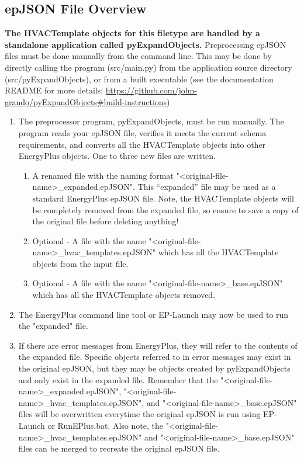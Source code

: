 \subsection{epJSON File Overview}
\textbf{The HVACTemplate objects for this filetype are handled by a standalone application called pyExpandObjects.}  Preprocessing epJSON files must be done manually from the command line.  This may be done by directly calling the program (src/main.py) from the application source directory (src/pyExpandObjects), or from a built executable (see the documentation README for more details: \url{https://github.com/john-grando/pyExpandObjects#build-instructions})

\begin{enumerate}
\def\labelenumi{\arabic{enumi})}
\item
  The preprocessor program, pyExpandObjects, must be run manually.  The program reads your epJSON file, verifies it meets the current schema requirements, and converts all the HVACTemplate objects into other EnergyPlus objects.  One to three new files are written.
  \begin{enumerate}
  \item
    A renamed file with the naming format "<original-file-name>\_expanded.epJSON". This “expanded” file may be used as a standard EnergyPlus epJSON file.  Note, the HVACTemplate objects will be completely removed from the expanded file, so ensure to save a copy of the original file before deleting anything!
  \item
    Optional - A file with the name "<original-file-name>\_hvac\_templates.epJSON" which has all the HVACTemplate objects from the input file.
  \item
    Optional - A file with the name "<original-file-name>\_base.epJSON" which has all the HVACTemplate objects removed.
  \end{enumerate}

\item
    The EnergyPlus command line tool or EP-Launch may now be used to run the "expanded" file.

\item
    If there are error messages from EnergyPlus, they will refer to the contents of the expanded file. Specific objects referred to in error messages may exist in the original epJSON, but they may be objects created by pyExpandObjects and only exist in the expanded file. Remember that the "<original-file-name>\_expanded.epJSON", "<original-file-name>\_hvac\_templates.epJSON", and "<original-file-name>\_base.epJSON" files will be overwritten everytime the original epJSON is run using EP-Launch or RunEPlus.bat.  Also note, the "<original-file-name>\_hvac\_templates.epJSON" and "<original-file-name>\_base.epJSON" files can be merged to recreate the original epJSON file.
\end{enumerate}

